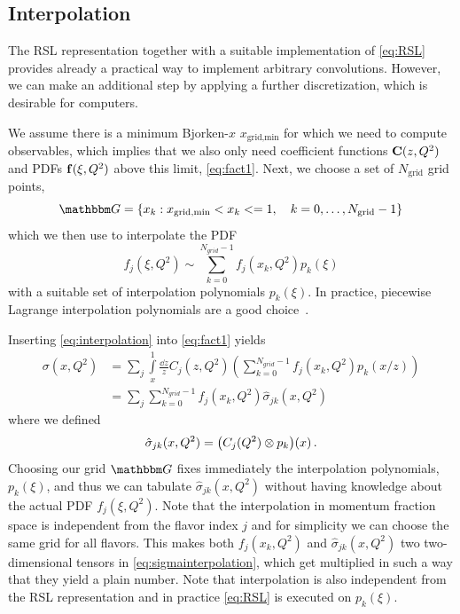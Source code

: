 \subsection{Interpolation}
The RSL representation together with a suitable implementation of \cref{eq:RSL} provides already a practical way to implement arbitrary convolutions.
However, we can make an additional step by applying a further discretization, which is desirable for computers.

We assume there is a minimum Bjorken-$x$ $x_\text{grid,min}$ for which we need to compute observables, which implies that we also only need coefficient functions $\vb C(z,Q^2)$ and PDFs $\vb f(\xi,Q^2)$ above this limit, \cref{eq:fact1}.
Next, we choose a set of $N_\text{grid}$ grid points,
\begin{equation}
    \mathbbm G = \{ x_k : x_\text{grid,min} < x_k <= 1, \quad k = 0,\ldots, N_\text{grid} - 1 \} \label{eq:grid}
\end{equation}
which we then use to interpolate the PDF
\begin{equation}
    f_j(\xi,Q^2) \sim \sum\limits_{k=0}^{N_{grid} - 1 } f_j(x_k,Q^2) p_k(\xi) \label{eq:interpolation}
\end{equation}
with a suitable set of interpolation polynomials $p_k(\xi)$.
In practice, piecewise Lagrange interpolation polynomials are a good choice~\cite{Candido:2022tld,Carrazza:2020gss}.

Inserting \cref{eq:interpolation} into \cref{eq:fact1} yields
\begin{align}
    \sigma(x,Q^2) &= \sum_{j} \int\limits_x^1 \frac{\dd z}{z} C_j(z,Q^2) \left( \sum\limits_{k=0}^{N_{grid} - 1 } f_j(x_k,Q^2) p_k(x/z) \right)\\
     &=\sum_{j} \sum\limits_{k=0}^{N_{grid} - 1 } f_j(x_k,Q^2) \hat \sigma_{jk}(x,Q^2) \label{eq:sigmainterpolation}
\end{align}
where we defined
\begin{equation}
    \hat \sigma_{jk}(x,Q^2) = \qty(C_j(Q^2) \otimes p_k)(x)\,.
\end{equation}
Choosing our grid $\mathbbm G$ fixes immediately the interpolation polynomials, $p_k(\xi)$, and thus we can tabulate $\hat \sigma_{jk}(x,Q^2)$ without having knowledge about the actual PDF $f_j(\xi,Q^2)$.
Note that the interpolation in momentum fraction space is independent from the flavor index $j$ and for simplicity we can choose the same grid for all flavors.
This makes both $f_j(x_k,Q^2)$ and $\hat \sigma_{jk}(x,Q^2)$ two two-dimensional tensors in \cref{eq:sigmainterpolation}, which get multiplied in such a way that they yield a plain number.
Note that interpolation is also independent from the RSL representation and in practice \cref{eq:RSL} is executed on $p_k(\xi)$.

